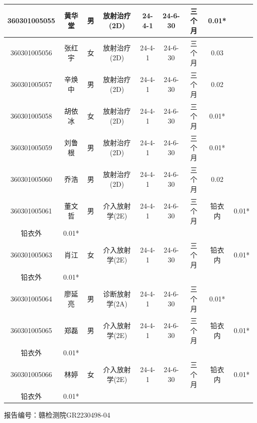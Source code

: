 \begin{table}[H]
\begin{tabular}{|c|c|c|c|c|c|c|c|c|}
\hline
360301005055 & 黄华堂 & 男 & 放射治疗(2D) & 24-4-1 & 24-6-30 & 三个月 & 0.01* &  \\
\hline
360301005056 & 张红宇 & 女 & 放射治疗(2D) & 24-4-1 & 24-6-30 & 三个月 & 0.03 &  \\
\hline
360301005057 & 辛焕中 & 男 & 放射治疗(2D) & 24-4-1 & 24-6-30 & 三个月 & 0.02 &  \\
\hline
360301005058 & 胡依冰 & 女 & 放射治疗(2D) & 24-4-1 & 24-6-30 & 三个月 & 0.01* &  \\
\hline
360301005059 & 刘鲁根 & 男 & 放射治疗(2D) & 24-4-1 & 24-6-30 & 三个月 & 0.01* &  \\
\hline
360301005060 & 乔浩 & 男 & 放射治疗(2D) & 24-4-1 & 24-6-30 & 三个月 & 0.02 &  \\
\hline
360301005061 & 董文哲 & 男 & 介入放射学(2E) & 24-4-1 & 24-6-30 & 三个月 & 铅衣内 & 0.01* \\
\hline
铅衣外 & 0.01* &  &  &  &  &  &  &  \\
\hline
360301005063 & 肖江 & 女 & 介入放射学(2E) & 24-4-1 & 24-6-30 & 三个月 & 铅衣内 & 0.01* \\
\hline
铅衣外 & 0.01* &  &  &  &  &  &  &  \\
\hline
360301005064 & 廖延亮 & 男 & 诊断放射学(2A) & 24-4-1 & 24-6-30 & 三个月 & 0.01* &  \\
\hline
360301005065 & 郑磊 & 男 & 介入放射学(2E) & 24-4-1 & 24-6-30 & 三个月 & 铅衣内 & 0.01* \\
\hline
铅衣外 & 0.01* &  &  &  &  &  &  &  \\
\hline
360301005066 & 林婷 & 女 & 介入放射学(2E) & 24-4-1 & 24-6-30 & 三个月 & 铅衣内 & 0.01* \\
\hline
铅衣外 & 0.01* &  &  &  &  &  &  &  \\
\hline
\end{tabular}
\end{table}


报告编号：赣检测院GR2230498-04


